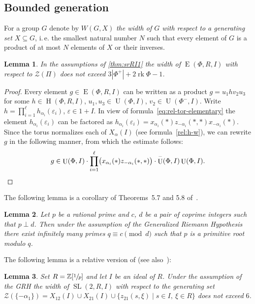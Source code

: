 \documentclass[11pt]{amsart}
\theoremstyle{plain}
\numberwithin{equation}{section}
\newtheorem{lemma}{Lemma}
\numberwithin{lemma}{section}
\theoremstyle{definition}
\theoremstyle{remark}
\DeclareMathOperator{\SL}{SL}
\DeclareMathOperator{\E}{E}
\DeclareMathOperator{\Hh}{H}
\DeclareMathOperator{\U}{U}
\DeclareMathOperator{\rk}{rk}
\begin{document}
\subsection{Bounded generation}\label{sec:boundgen}
For a group $G$ denote by $W(G, X)$ \emph{the width of $G$ with respect to a generating set $X \subseteq G$}, i.\,e. the smallest natural number $N$ 
such that every element of $G$ is a product of at most $N$ elements of $X$ or their inverses.

\begin{lemma}\label{lemma:srRI1_width}
In the assumptions of \cref{thm:srRI1} the width of $\E(\Phi,R,I)$ with respect to $\mathcal{Z}(\Pi)$ does not exceed $3\left|\Phi^+\right|+2\rk\Phi-1$.
\end{lemma}
\begin{proof}
Every element $g\in\E(\Phi,R,I)$ can be written as a product $g=u_1 h v_2 u_3$ for some $h\in\Hh(\Phi,R,I)$, $u_1,u_3\in\U(\Phi,I)$, $v_2\in\U(\Phi^-,I)$. 
Write $h=\prod_{i=1}^\ell h_{\alpha_i}(\varepsilon_i)$, $\varepsilon\in1+I$. 
In view of formula~\eqref{eq:rel-tor-elementary} the element $h_{\alpha_i}(\varepsilon_i)$ can be factored as 
 $h_{\alpha_i}(\varepsilon_i) = x_{\alpha_i}(*) z_{-\alpha_i}(*,*) x_{-\alpha_i}(*)$.
Since the torus normalizes each of $X_\alpha(I)$ (see formula~\eqref{rel:h-w}), we can rewrite $g$ in the following manner, from which the estimate follows:
\[ g\in\U(\Phi,I)\cdot\prod_{i=1}^\ell\bigl(x_{\alpha_i}(*)z_{-\alpha_i}(*,*)\bigr)\cdot \U^-(\Phi,I) \U(\Phi,I). \qedhere \] \end{proof}

The following lemma is a corollary of Theorems~5.7 and 5.8 of~\cite{LSM}.
\begin{lemma}
Let $p$ be a rational prime and $c$, $d$ be a pair of coprime integers such that $p \perp d$.
Then under the assumption of the Generalized Riemann Hypothesis there exist infinitely many primes $q\equiv c\pmod{d}$ such that $p$ is a primitive root modulo $q$.
\end{lemma}

The following lemma is a relative version of \cite[Lemma~6]{VavSmSuUnitrEng} (see also~\cite{VseUnitrZ1p}):

\begin{lemma}\label{lemma:Z1p}
Set $R=\mathbb{Z}[\sfrac{1}{p}]$ and let $I$ be an ideal of $R$.
Under the assumption of the GRH the width of $\SL(2, R, I)$ with respect to the generating set
$\mathcal{Z}(\{-\alpha_1\})=X_{12}(I)\cup X_{21}(I) \cup \{z_{21}(s, \xi) \mid s\in I,\ \xi\in R\}$
does not exceed $6$.
\end{lemma}
\end{document}
